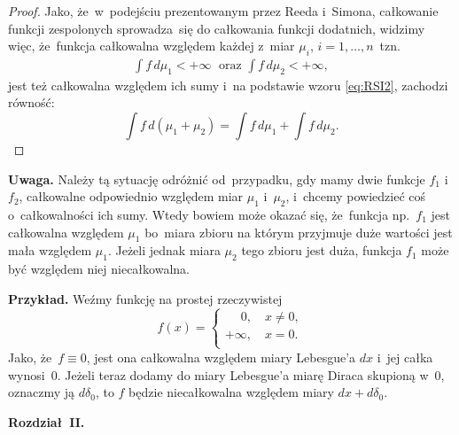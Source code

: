 \documentclass[a4paper,11pt]{article}
\newcommand{\spaceTwo}{1em}
\newcommand{\spaceThree}{0.5em}
\newcommand{\ld}{\ldots}
\newcommand{\tr}{\textrm}
\newcommand{\del}{\delta}
\newcommand{\Int}{\int\limits}
\newcommand{\IntCaD}[2] { \Int #1 \, d#2 } %
\newcommand{\tb}{\textbf}
\newcommand{\noi}{\noindent}
\begin{document}
\begin{proof}
  Jako, że~w~podejściu prezentowanym przez Reeda i~Simona, całkowanie
  funkcji zespolonych sprowadza~się do całkowania funkcji dodatnich,
  widzimy więc, że~funkcja całkowalna względem każdej z~miar
  $\mu_{ i }$, $i = 1, \ld, n$~tzn.
  \begin{align*}
    \IntCaD{ f }{ \mu_{ 1 } } < +\infty \;\tr{  oraz  } \IntCaD{ f }{ \mu_{ 2 } }
    < +\infty,
  \end{align*}
  jest też całkowalna względem ich sumy i~na podstawie wzoru
  \eqref{eq:RSI2}, zachodzi równość:
  \begin{equation}
    \label{eq:RSI3}
    \IntCaD{ f }{ ( \mu_{ 1 } + \mu_{ 2 } ) } = \IntCaD{ f }{ \mu_{ 1 } }
    + \IntCaD{ f }{ \mu_{ 2 } }.
  \end{equation}

\end{proof}


\tb{Uwaga.} Należy tą sytuację odróżnić od~przypadku, gdy mamy dwie
funkcje $f_{ 1 }$ i~$f_{ 2 }$, całkowalne odpowiednio względem miar
$\mu_{ 1 }$ i~$\mu_{ 2 }$, i~chcemy powiedzieć coś o~całkowalności ich
sumy. Wtedy bowiem może okazać się, że~funkcja np.~$f_{ 1 }$ jest
całkowalna względem $\mu_{ 1 }$ bo~miara zbioru na którym przyjmuje
duże wartości jest mała względem $\mu_{ 1 }$. Jeżeli jednak miara
$\mu_{ 2 }$ tego zbioru jest duża, funkcja $f_{ 1 }$ może być względem
niej niecałkowalna.

\tb{Przykład.} Weźmy funkcję na prostej rzeczywistej
\begin{equation*}
  f( x ) =
  \begin{cases}
    \quad \;0, \quad x \neq 0, \\
    +\infty, \quad x = 0. \\
  \end{cases}
\end{equation*}
Jako, że~$f \equiv 0$, jest ona całkowalna względem miary Lebesgue'a
$dx$ i~jej całka
wynosi~0.%
Jeżeli teraz dodamy do miary Lebesgue'a miarę Diraca skupioną w~0,
oznaczmy ją $d\del_{ 0 }$, to $f$ będzie niecałkowalna względem miary
$dx + d\del_{ 0 }$.

\vspace{\spaceTwo}



\noi \tb{Rozdział~II.}

\vspace{\spaceThree}
\end{document}
